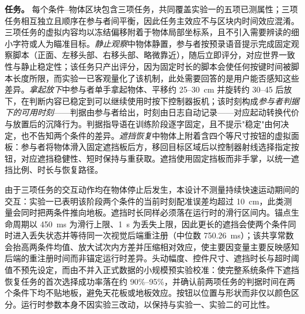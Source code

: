\documentclass[review]{vgtc}
\begin{document}
\textbf{任务。} 每个条件--物体区块包含三项任务，共同覆盖实验一的五项已测属性；三项任务相互独立且顺序在参与者间平衡，因此任务主效应不与区块内时间效应混淆。三项任务的虚拟内容均以冻结偏移附着于物体局部坐标系，且不引入需要辨读的细小字符或人为瞄准目标。\emph{静止观察}中物体静置，参与者按预录语音提示完成固定观察脚本（正面、左移头部、右移头部、略微靠近），随后立即评分，对应世界一致性与静止稳定性；该任务只产出评分，因为固定时长的脚本会使任何按键时间被脚本长度所限，而实验一已客观量化了该机制，此处需要回答的是用户能否感知这些差异。\emph{拿起放下}中参与者单手拿起物体、平移约 25--30~cm 并旋转约 30--45\textdegree{} 后放下，在判断内容已稳定到可以继续使用时按下控制器扳机；该时刻构成\emph{参与者判据下的可用时刻}——判据由参与者给出，时刻由日志自动记录——对应起动转换代价与放置后的沉降行为。判据指导语在训练阶段逐字固定，且不提示"稳定"由何决定，也不告知两个条件的差异。\emph{遮挡恢复}中物体上附着含四个等尺寸按钮的虚拟面板：参与者将物体滑入固定遮挡板后方，移回目标区域后以控制器射线选择指定按钮，对应遮挡稳健性、短时保持与重获取。遮挡使用固定挡板而非手掌，以统一遮挡比例、时长与恢复路径。

由于三项任务的交互动作均在物体停止后发生，本设计不测量持续快速运动期间的交互：实验一已表明该阶段两个条件的当前时刻配准误差均超过 10~cm，此类测量会同时把两条件推向地板。遮挡时长同样必须落在运行时的滑行区间内。锚点生命周期以 450~ms 为滑行上限、1~s 为丢失上限，因此更长的遮挡会使两个条件同时进入丢失状态并等待同一次视觉后端重注册（中位数 750.26~ms）；该共享常数会抬高两条件均值、放大试次内方差并压缩相对效应，使主要因变量主要反映感知后端的重注册时间而非锚定运行时差异。头动幅度、控件尺寸、遮挡时长与超时阈值不预先设定，而由不并入正式数据的小规模预实验校准：使完整系统条件下遮挡恢复任务的首次选择成功率落在约 90\%--95\%，并确认前两项任务的判据时间在两个条件下均不贴地板，避免天花板或地板效应。按钮以位置与形状而非仅以颜色区分。运行时参数本身不因实验三改动，以保持与实验一、实验二的可比性。
\end{document}
